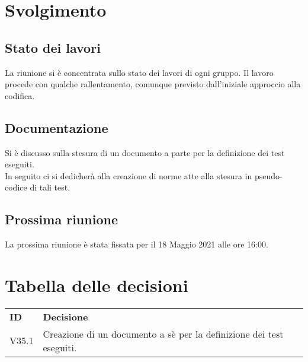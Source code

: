 \documentclass[]{article}
\begin{document}
	\newpage

	\section{Svolgimento}
		\subsection{Stato dei lavori}
		La riunione si è concentrata sullo stato dei lavori di ogni gruppo. Il lavoro procede con qualche rallentamento, comunque previsto dall'iniziale approccio alla codifica.\\
		
		\subsection{Documentazione}
		Si è discusso sulla stesura di un documento a parte per la definizione dei test eseguiti. \\
		In seguito ci si dedicherà alla creazione di norme atte alla stesura in pseudo-codice di tali test.\\

		\subsection{Prossima riunione}
		La prossima riunione è stata fissata per il 18 Maggio 2021 alle ore 16:00.\\




	\section{Tabella delle decisioni}

	\begin{table} [h!]
		\begin{center}
			\begin{tabular} { m{2cm} m{14cm} }
				\rowcolor{lightgray}
				\textbf{ID} & \textbf{Decisione}\\
				V35.1 & Creazione di un documento a sè per la definizione dei test eseguiti.
			\end{tabular}
		\end{center}
	\end{table}
\end{document}
